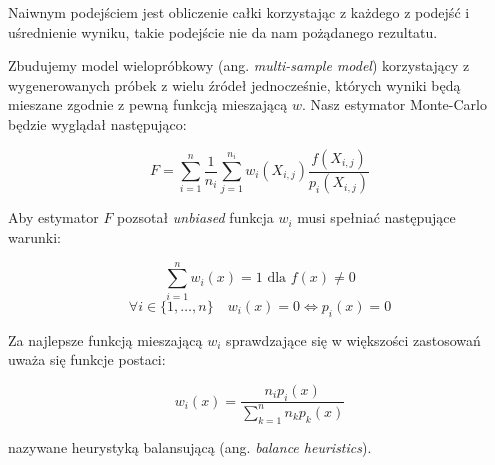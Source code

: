 \documentclass[../main.tex]{subfiles}
\begin{document}
Naiwnym podejściem jest obliczenie całki korzystając z każdego z podejść
i uśrednienie wyniku, takie podejście nie da nam pożądanego rezultatu.

Zbudujemy model wielopróbkowy (ang. \textit{multi-sample model})
\cite{pbrt}\cite{ImportanceSamplingForProduction} korzystający z wygenerowanych
próbek z wielu źródeł jednocześnie, których wyniki będą mieszane zgodnie z
pewną funkcją mieszającą $w$. Nasz estymator Monte-Carlo będzie wyglądał
następująco:

\[
  F = \sum_{i=1}^{n} \frac{1}{n_i} \sum_{j=1}^{n_i} w_{i}(X_{i,j}) \frac{
    f(X_{i,j})
  }{
    p_{i}(X_{i,j})
  }
\]

Aby estymator $F$ pozsotał \textit{unbiased} funkcja $w_i$ musi spełniać
następujące warunki:

\[ \sum_{i = 1}^{n} w_{i}(x) = 1 \text{ dla } f(x) \neq 0 \]
\[
  \forall i \in \{ 1, \ldots, n \} \quad
  w_{i}(x) = 0 \Leftrightarrow p_i(x) = 0
\]

Za najlepsze funkcją mieszającą $w_i$ sprawdzające się w większości zastosowań
uważa się funkcje postaci:

\[
  w_{i}(x) = \frac{
    n_{i} p_{i}(x)
  }{
    \sum_{k=1}^{n} {
      n_{k} p_{k}(x)
    }
  }
\]

\noindent nazywane heurystyką balansującą (ang. \textit{balance heuristics}).
\end{document}
